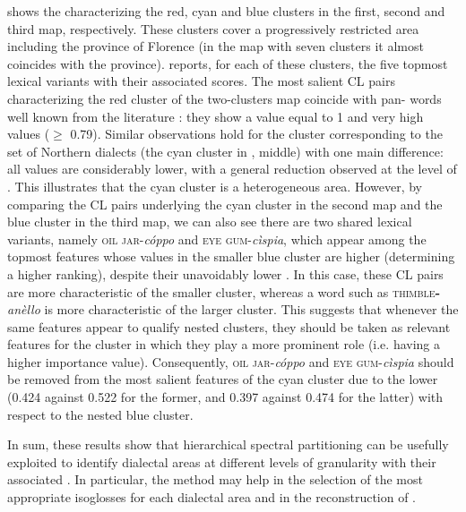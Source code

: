 \documentclass[output=paper]{LSP/langsci}
\begin{document}
\largerpage[-1]%

 shows the  characterizing the red, cyan and blue clusters in the first, second and third map, respectively. These clusters cover a progressively restricted area including the province of Florence (in the map with seven clusters it almost coincides with the province).  reports, for each of these clusters, the five topmost lexical variants with their associated scores. The most salient CL pairs characterizing the red cluster of the two-clusters map coincide with pan- words well known from the literature \citep{giacomelli_parole_1984}: they show a  value equal to 1 and very high  values (${\geq}$ 0.79). Similar observations hold for the cluster corresponding to the set of Northern  dialects (the cyan cluster in , middle) with one main difference: all values are considerably lower, with a general reduction observed at the level of . This illustrates that the cyan cluster is a heterogeneous area. However, by comparing the CL pairs underlying the cyan cluster in the second map and the blue cluster in the third map, we can also see there are two shared lexical variants, namely \textsc{oil jar}{}-\textit{cóppo }and \textsc{eye gum}{}-\textit{cìspia}, which appear among the topmost features whose  values in the smaller blue cluster are higher (determining a higher ranking), despite their unavoidably lower . In this case, these CL pairs are more characteristic of the smaller cluster, whereas a word such as \textsc{thimble}\textbf{\textsc{{}-}}\textit{anèllo }is more characteristic of the larger cluster. This suggests that whenever the same features appear to qualify nested clusters, they should be taken as relevant features for the cluster in which they play a more prominent role (i.e. having a higher importance value). Consequently, \textsc{oil jar}{}-\textit{cóppo }and \textsc{eye gum}{}-\textit{cìspia }should be removed from the most salient features of the cyan cluster due to the lower  (0.424 against 0.522 for the former, and 0.397 against 0.474 for the latter) with respect to the nested blue cluster.

In sum, these results show that hierarchical spectral partitioning can be usefully exploited to identify dialectal areas at different levels of granularity with their associated . In particular, the method may help in the selection of the most appropriate isoglosses for each dialectal area and in the reconstruction of .
\end{document}
